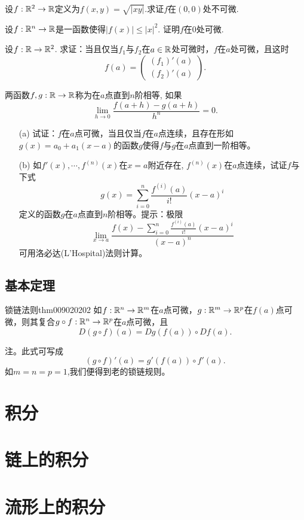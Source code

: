 \begin{problemset}
\item 设$f:\mathbb{R}^2 \to \mathbb{R}$定义为$f(x, y) = \sqrt{|xy|}$.求证$f$在$(0, 0)$处不可微.

\item 设$f:\mathbb{R}^n \to \mathbb{R}$是一函数使得$|f(x)| \le |x|^2$. 证明$f$在0处可微.

\item 设$f:\mathbb{R} \to \mathbb{R}^2$. 求证：当且仅当$f_1$与$f_2$在$a \in \mathbb{R}$处可微时，$f$在$a$处可微，且这时
\[
f(a) = \begin{pmatrix}
(f_1)'(a)\\
(f_2)'(a)
\end{pmatrix}.
\]


\item 两函数$f,g:\mathbb{R} \to \mathbb{R}$称为在$a$点直到$n$阶相等, 如果
\[
\lim_{h \to 0}{\frac{f(a+h) - g(a+h)}{h^n}} = 0.
\]
\begin{enumerate}
\item[(a)] 试证：$f$在$a$点可微，当且仅当$f$在$a$点连续，且存在形如$g(x)=a_0 + a_1(x-a)$的函数$g$使得$f$与$g$在$a$点直到一阶相等。
\item[(b)] 如$f'(x),\cdots,f^{(n)}(x)$在$x=a$附近存在, $f^{(n)}(x)$在$a$点连续，试证$f$与下式
\[
g(x) = \sum_{i=0}^{n}{\frac{f^{(i)}(a)}{i!}(x-a)^i}
\]
定义的函数$g$在$a$点直到$n$阶相等。提示：极限
\[
\lim_{x \to a}{\frac{f(x) - \sum_{i=0}^{n}{\frac{f^{(i)}(a)}{i!}(x-a)^i}}{(x-a)^n}}
\]
可用洛必达(L'Hospital)法则计算。
\end{enumerate}

\end{problemset}


\section{基本定理}\label{section0090202}
\begin{theorem}{锁链法则}{thm009020202}
如$f:\mathbb{R}^n \to \mathbb{R}^m$在$a$点可微，$g:\mathbb{R}^m \to \mathbb{R}^p$在$f(a)$点可微，则其复合$g \circ f: \mathbb{R}^n \to \mathbb{R}^p$在$a$点可微，且
\[
D(g \circ f)(a) = Dg(f(a)) \circ Df(a).
\]
\end{theorem}

注。此式可写成
\[
(g \circ f)'(a) = g'(f(a)) \circ f'(a).
\]
如$m=n=p=1$,我们便得到老的锁链规则。




\chapter{积分}\label{chapter00903}




\chapter{链上的积分}\label{chapter00904}




\chapter{流形上的积分}\label{chapter00905}

